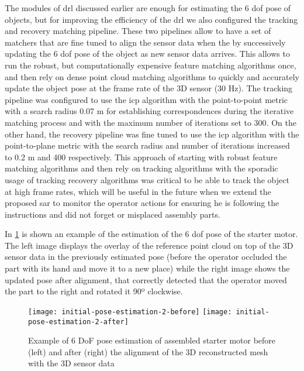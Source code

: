The modules of drl discussed earlier are enough for estimating the 6 \gls{dof} pose of objects, but for improving the efficiency of the drl we also configured the tracking and recovery matching pipeline. These two pipelines allow to have a set of matchers that are fine tuned to align the sensor data when the by successively updating the 6 \gls{dof} pose of the object as new sensor data arrives. This allows to run the robust, but computationally expensive feature matching algorithms once, and then rely on dense point cloud matching algorithms to quickly and accurately update the object pose at the frame rate of the 3D sensor (30 Hz). The tracking pipeline was configured to use the \gls{icp} algorithm with the point-to-point metric with a search radius 0.07 m for establishing correspondences during the iterative matching process and with the maximum number of iterations set to 300. On the other hand, the recovery pipeline was fine tuned to use the \gls{icp} algorithm with the point-to-plane metric with the search radius and number of iterations increased to 0.2 m and 400 respectively. This approach of starting with robust feature matching algorithms and then rely on tracking algorithms with the sporadic usage of tracking recovery algorithms was critical to be able to track the object at high frame rates, which will be useful in the future when we extend the proposed \gls{sar} to monitor the operator actions for ensuring he is following the instructions and did not forget or misplaced assembly parts.

In \cref{fig:initial-pose-estimation} is shown an example of the estimation of the 6 \gls{dof} pose of the starter motor. The left image displays the overlay of the reference point cloud on top of the 3D sensor data in the previously estimated pose (before the operator occluded the part with its hand and move it to a new place) while the right image shows the updated pose after alignment, that correctly detected that the operator moved the part to the right and rotated it 90º clockwise.

\begin{figure}[!ht]
	\centering
	\texttt{[image: initial-pose-estimation-2-before]}
	\texttt{[image: initial-pose-estimation-2-after]}
	\caption{Example of 6 DoF pose estimation of assembled starter motor before (left) and after (right) the alignment of the 3D reconstructed mesh with the 3D sensor data}
	\label{fig:initial-pose-estimation}
\end{figure}

